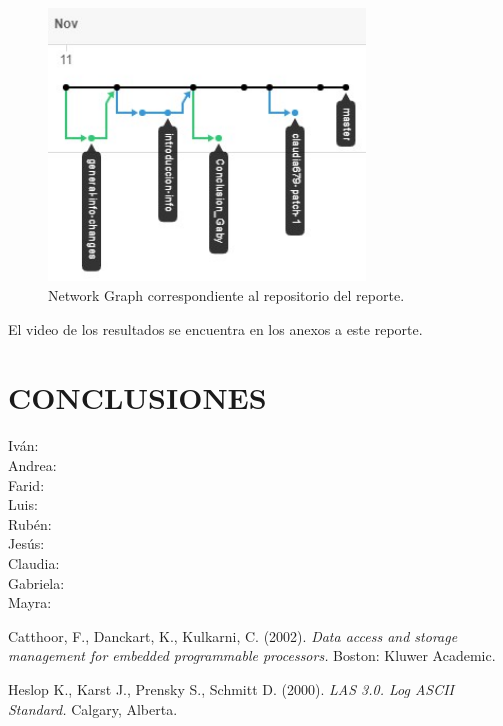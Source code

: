 \documentclass[12pt, letterpaper]{article}
\begin{document}
\begin{figure}[H]
    \centering
    \includegraphics[width=0.75\textwidth]{img/desarrollo/DOC_NETWORK.jpg}
    \caption{Network Graph correspondiente al repositorio del reporte.}
\end{figure}

El video de los resultados se encuentra en los anexos a este reporte.
\pagebreak

\section{CONCLUSIONES}
Iván: \\
Andrea: \\
Farid: \\
Luis: \\
Rubén: \\
Jesús: \\
Claudia: \\
Gabriela: \\
Mayra: \\
\pagebreak

\begin{thebibliography}{2}
    Catthoor, F., Danckart, K., Kulkarni, C.
    (2002). 
    \textit{Data access and storage management for embedded programmable processors.} 
    Boston: Kluwer Academic.

    Heslop K., Karst J., Prensky S., Schmitt D.
    (2000).
    \textit{LAS 3.0. Log ASCII Standard.}
    Calgary, Alberta.
\end{thebibliography}
\end{document}
